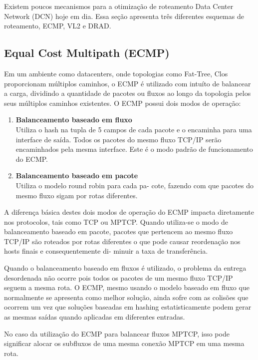 \documentclass[12pt,a4paper]{report}
\begin{document}
Existem poucos mecanismos para a otimização de roteamento Data Center Network (DCN)
hoje em dia. Essa seção apresenta três diferentes esquemas de roteamento, ECMP, VL2 e DRAD.

\subsection{Equal Cost Multipath (ECMP)}

  Em um ambiente como datacenters, onde topologias como Fat-Tree, Clos proporcionam múltiplos caminhos,  
  o ECMP é utilizado com intuíto de balancear a carga, dividindo a quantidade de pacotes ou fluxos ao
  longo da topologia pelos seus múltiplos caminhos existentes. 
  O ECMP possui dois modos de operação:


  \begin{enumerate}
    \item  \textbf{Balanceamento baseado em fluxo}\\  
      Utiliza o hash na tupla de 5 campos de cada
      pacote e o encaminha para uma interface de saída. Todos os pacotes do mesmo
      fluxo TCP/IP serão encaminhados pela mesma interface. Este é o modo padrão de
      funcionamento do ECMP.

    \item \textbf{Balanceamento baseado em pacote}\\
      Utiliza o modelo round robin para cada pa-
      cote, fazendo com que pacotes do mesmo fluxo sigam por rotas diferentes.

  \end{enumerate}

  A diferença básica destes dois modos de operação do ECMP impacta diretamente
  nos protocolos, tais como TCP ou MPTCP. Quando utiliza-se o modo de balanceamento
  baseado em pacote, pacotes que pertencem ao mesmo fluxo TCP/IP são roteados por
  rotas diferentes o que pode causar reordenação nos hosts finais e consequentemente di-
  minuir a taxa de transferência. 

  Quando o balanceamento baseado em fluxos é utilizado, o problema da entrega desordenada
  não ocorre pois todos os pacotes de um mesmo fluxo TCP/IP seguem a mesma rota.
  O ECMP, mesmo usando o modelo baseado em fluxo que normalmente se apresenta como 
  melhor solução, ainda sofre com as colisões que ocorrem
  um vez que soluções baseadas em hashing estatisticamente podem gerar as mesmas saídas
  quando aplicadas em diferentes entradas. 
  
  No caso da utilização do ECMP para balancear fluxos MPTCP, isso pode significar 
  alocar os subfluxos de uma mesma conexão MPTCP em uma mesma rota.
\end{document}
